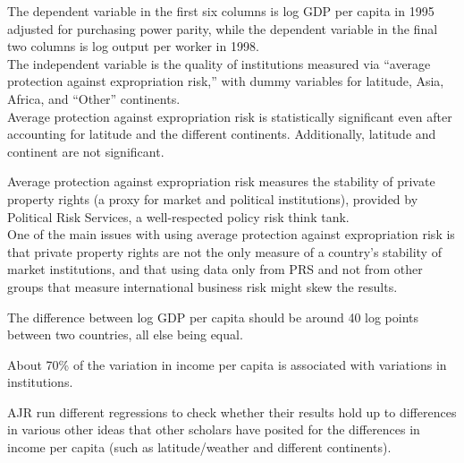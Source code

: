 \documentclass[8pt]{extarticle}
\begin{document}
  \begin{solution}
    \begin{tcolorbox}[colback = white, title = (a)]
      The dependent variable in the first six columns is log GDP per capita in 1995 adjusted for purchasing power parity, while the dependent variable in the final two columns is log output per worker in 1998.\\

      The independent variable is the quality of institutions measured via ``average protection against expropriation risk,'' with dummy variables for latitude, Asia, Africa, and ``Other'' continents.\\

      Average protection against expropriation risk is statistically significant even after accounting for latitude and the different continents. Additionally, latitude and continent are not significant.
    \end{tcolorbox}
    \begin{tcolorbox}[colback = white, title = (b)]
      Average protection against expropriation risk measures the stability of private property rights (a proxy for market and political institutions), provided by Political Risk Services, a well-respected policy risk think tank.\\

      One of the main issues with using average protection against expropriation risk is that private property rights are not the only measure of a country's stability of market institutions, and that using data only from PRS and not from other groups that measure international business risk might skew the results.
    \end{tcolorbox}
    \begin{tcolorbox}[colback = white, title = (c)]
      The difference between log GDP per capita should be around 40 log points between two countries, all else being equal.
    \end{tcolorbox}
    \begin{tcolorbox}[colback = white, title = (d)]
      About 70\% of the variation in income per capita is associated with variations in institutions.
    \end{tcolorbox}
    \begin{tcolorbox}[colback = white, title = (e)]
      AJR run different regressions to check whether their results hold up to differences in various other ideas that other scholars have posited for the differences in income per capita (such as latitude/weather and different continents).
    \end{tcolorbox}
  \end{solution}
\end{document}
